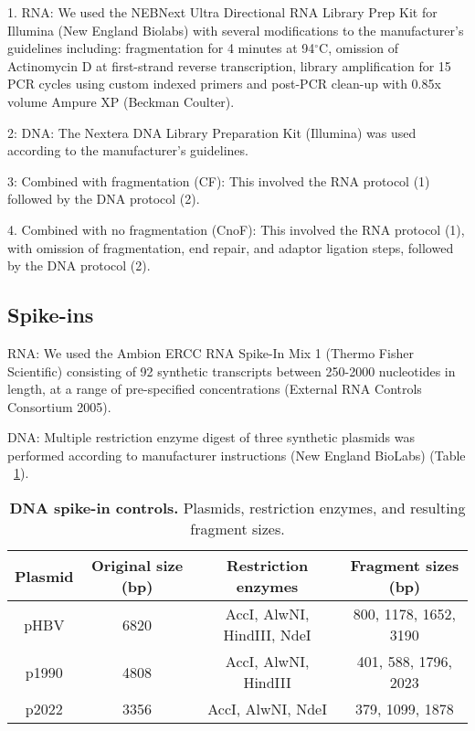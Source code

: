 1. RNA: We used the NEBNext Ultra Directional RNA Library Prep Kit for Illumina (New England Biolabs) with several modifications to the manufacturer’s guidelines including: fragmentation for 4 minutes at 94$^{\circ}$C, omission of Actinomycin D at first-strand reverse transcription, library amplification for 15 PCR cycles using custom indexed primers and post-PCR clean-up with 0.85x volume Ampure XP (Beckman Coulter).

2: DNA: The Nextera DNA Library Preparation Kit (Illumina) was used according to the manufacturer's guidelines.

3: Combined with fragmentation (CF): This involved the RNA protocol (1) followed by the DNA protocol (2).

4. Combined with no fragmentation (CnoF): This involved the RNA protocol (1), with omission of fragmentation, end repair, and adaptor ligation steps, followed by the DNA protocol (2). 

\subsection{Spike-ins}
RNA: We used the Ambion ERCC RNA Spike-In Mix 1 (Thermo Fisher Scientific) consisting of 92 synthetic transcripts between 250-2000 nucleotides in length, at a range of pre-specified concentrations (External RNA Controls Consortium 2005).

DNA: Multiple restriction enzyme digest of three synthetic plasmids was performed according to manufacturer instructions (New England BioLabs) (Table ~\ref{tab:plasmid}). 

\begin{table}[htbp]
\begin{center}
\begin{tabular}{|c|c|c|c|}
\hline
Plasmid & Original size (bp) & Restriction enzymes & Fragment sizes (bp)\\
\hline
pHBV & 6820 & AccI, AlwNI, HindIII, NdeI & 800, 1178, 1652, 3190\\
p1990 & 4808 & AccI, AlwNI, HindIII & 401, 588, 1796, 2023\\
p2022 & 3356 & AccI, AlwNI, NdeI & 379, 1099, 1878\\
\hline
\end{tabular}
\end{center}
\smallskip
\caption[DNA plasmid spike-in controls]{\textbf{DNA spike-in controls.} Plasmids, restriction enzymes, and resulting fragment sizes.}
\label{tab:plasmid}
\end{table}


